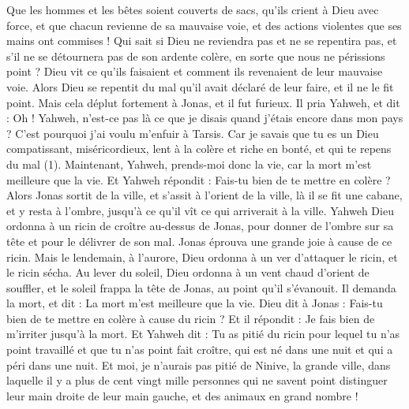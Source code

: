 \begin{multicols}{2}
Que les hommes et les bêtes soient couverts de sacs, qu'ils crient à Dieu avec force, et que chacun revienne de sa mauvaise voie, et des actions violentes que ses mains ont commises !
Qui sait si Dieu ne reviendra pas et ne se repentira pas, et s'il ne se détournera pas de son ardente colère, en sorte que nous ne périssions point ?
Dieu vit ce qu’ils faisaient et comment ils revenaient de leur mauvaise voie. Alors Dieu se repentit du mal qu'il avait déclaré de leur faire, et il ne le fit point.
\VerseOne{}Mais cela déplut fortement à Jonas, et il fut furieux.
Il pria Yahweh, et dit : Oh ! Yahweh, n'est-ce pas là ce que je disais quand j'étais encore dans mon pays ? C'est pourquoi j'ai voulu m'enfuir à Tarsis. Car je savais que tu es un Dieu compatissant, miséricordieux, lent à la colère et riche en bonté, et qui te repens du mal (1).
Maintenant, Yahweh, prends-moi donc la vie, car la mort m'est meilleure que la vie.
Et Yahweh répondit : Fais-tu bien de te mettre en colère ?
Alors Jonas sortit de la ville, et s'assit à l'orient de la ville, là il se fit une cabane, et y resta à l'ombre, jusqu'à ce qu'il vît ce qui arriverait à la ville.
Yahweh Dieu ordonna à un ricin de croître au-dessus de Jonas, pour donner de l’ombre sur sa tête et pour le délivrer de son mal. Jonas éprouva une grande joie à cause de ce ricin.
Mais le lendemain, à l’aurore, Dieu ordonna à un ver d’attaquer le ricin, et le ricin sécha.
Au lever du soleil, Dieu ordonna à un vent chaud d’orient de souffler, et le soleil frappa la tête de Jonas, au point qu’il s’évanouit. Il demanda la mort, et dit : La mort m'est meilleure que la vie.
Dieu dit à Jonas : Fais-tu bien de te mettre en colère à cause du ricin ? Et il répondit : Je fais bien de m’irriter jusqu’à la mort.
Et Yahweh dit : Tu as pitié du ricin pour lequel tu n'as point travaillé et que tu n'as point fait croître, qui est né dans une nuit et qui a péri dans une nuit.
Et moi, je n’aurais pas pitié de Ninive, la grande ville, dans laquelle il y a plus de cent vingt mille personnes qui ne savent point distinguer leur main droite de leur main gauche, et des animaux en grand nombre !
\PPE{}
\end{multicols}
